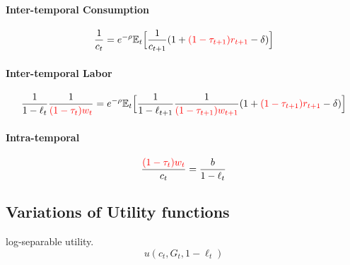 \documentclass[11pt]{article}
\newcommand{\expat}[2]{\mathbb{E}_{#1}\Big[{#2}\Big]}
\begin{document}
			\paragraph{Inter-temporal Consumption}
				\begin{equation}
					\frac{1}{c_t} = e^{-\rho} \expat{t}{\frac{1}{c_{t+1}} (1 + \textcolor{red}{(1 - \tau_{t+1})r_{t+1}} - \delta)
					}
				\end{equation}
			
			\paragraph{Inter-temporal Labor}
				\begin{equation}
					\frac{1}{1-\ell_t} \frac{1}{\textcolor{red}{(1-\tau_t)w_t}} = e^{-\rho} \expat{t}{
						\frac{1}{1-\ell_{t+1}} \frac{1}{\textcolor{red}{(1-\tau_{t+1})w_{t+1}}}(1 + \textcolor{red}{(1 - \tau_{t+1})r_{t+1}} - \delta)
					}
				\end{equation}
				
			\paragraph{Intra-temporal}
				\begin{equation}
					\frac{\textcolor{red}{(1-\tau_t) w_t}}{c_t} = \frac{b}{1-\ell_t}
				\end{equation}
				
		\subsection{Variations of Utility functions}
			\begin{example} log-separable utility. 
				\begin{equation}
					u(c_t, G_t, 1 - \ell_t)
				\end{equation}
			\end{example}
\end{document}
